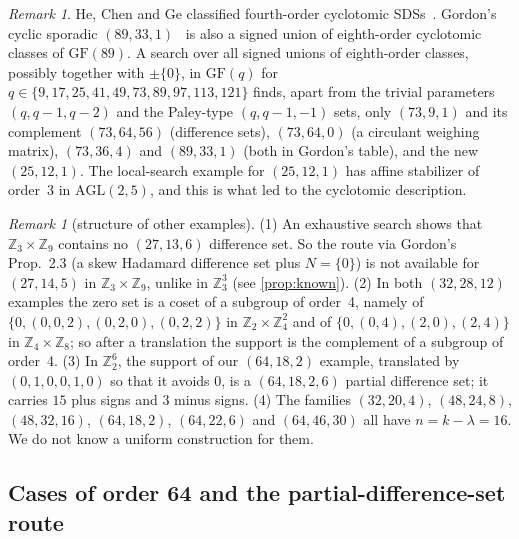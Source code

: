 \documentclass[11pt]{article}
\numberwithin{equation}{section}
\theoremstyle{definition}
\theoremstyle{remark}
\newtheorem{remark}[theorem]{Remark}
\newcommand{\Z}{\mathbb Z}
\newcommand{\GF}{\mathrm{GF}}
\begin{document}
\begin{remark}
He, Chen and Ge classified fourth-order cyclotomic SDSs~\cite{HeChenGe2024}. Gordon's cyclic
sporadic $(89,33,1)$~\cite{Gordon2023} is also a signed union of eighth-order cyclotomic classes
of $\GF(89)$. A search over all signed unions of eighth-order classes, possibly together with
$\pm\{0\}$, in $\GF(q)$ for $q\in\{9,17,25,41,49,73,89,97,113,121\}$ finds, apart from the trivial
parameters $(q,q-1,q-2)$ and the Paley-type $(q,q-1,-1)$ sets, only $(73,9,1)$ and its complement
$(73,64,56)$ (difference sets), $(73,64,0)$ (a circulant weighing matrix), $(73,36,4)$ and
$(89,33,1)$ (both in Gordon's table), and the new $(25,12,1)$. The local-search example for $(25,12,1)$ has
affine stabilizer of order~3 in $\mathrm{AGL}(2,5)$, and this is what led to the cyclotomic
description.
\end{remark}

\begin{remark}[structure of other examples]
(1) An exhaustive search shows that $\Z_3\times\Z_9$ contains no $(27,13,6)$ difference set.
So the route via Gordon's Prop.~2.3 (a skew Hadamard difference set plus $N=\{0\}$) is not
available for $(27,14,5)$ in $\Z_3\times\Z_9$, unlike in $\Z_3^3$ (see \cref{prop:known}).
(2) In both $(32,28,12)$ examples the zero set is a coset of a subgroup of order~4, namely of
$\{0,(0,0,2),(0,2,0),(0,2,2)\}$ in $\Z_2\times\Z_4^2$ and of $\{0,(0,4),(2,0),(2,4)\}$ in
$\Z_4\times\Z_8$; so after a translation the support is the complement of a subgroup of order~4.
(3) In $\Z_2^6$, the support of our $(64,18,2)$ example, translated by $(0,1,0,0,1,0)$ so that
it avoids $0$, is a $(64,18,2,6)$ partial difference set; it carries $15$ plus signs and $3$ minus
signs.
(4) The families $(32,20,4)$, $(48,24,8)$, $(48,32,16)$, $(64,18,2)$, $(64,22,6)$ and
$(64,46,30)$ all have $n=k-\lambda=16$. We do not know a uniform construction for them.
\end{remark}

\subsection{Cases of order 64 and the partial-difference-set route}
\end{document}
